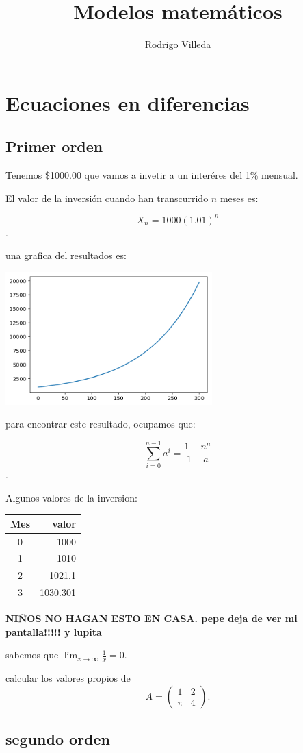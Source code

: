 \documentclass{article}
\title{Modelos matemáticos}
\author{Rodrigo Villeda}
\begin{document}
\maketitle
\section{Ecuaciones en diferencias}
\subsection{Primer orden}

Tenemos \$1000.00 que vamos a invetir a un interéres del 1\% mensual.


El valor de la inversión cuando han transcurrido $n$ meses es:

                        $$X_n=1000(1.01)^n$$.
                        
 una grafica del resultados es:

\begin{center}
\includegraphics[width=8cm]{gs}
\end{center}

para encontrar este resultado, ocupamos que:

$$\sum_{i=0}^{n-1}a^i=\frac{1-n^{n}}{1-a}$$.


Algunos valores de la inversion:
\begin{center}
\begin{tabular}{|c|r|}
\hline
Mes & valor\\
\hline
0 & 1000\\
1 & 1010\\
2 & 1021.1\\
3 & 1030.301\\
\hline
\end{tabular}
\end{center}




\begin{center}
\huge
\textbf{NIÑOS NO HAGAN ESTO EN CASA.
pepe deja de ver mi pantalla!!!!!
y lupita }
\end{center}



sabemos que $\lim_{x\to\infty}\frac{1}{x}=0$.

calcular los valores propios de $$A=
\begin{pmatrix}
1 & 2\\
\pi & 4
\end{pmatrix}
.$$

\subsection{segundo orden}
\end{document}
